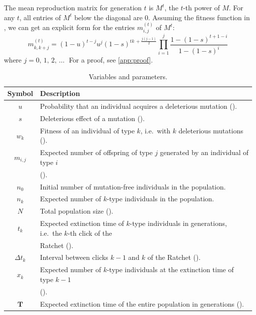 \documentclass[9pt,lineno]{elife}
\begin{document}
The mean reproduction matrix for generation $t$ is $M^{t}$, the $t$-th power of $M$. For any $t$, all entries of $M^{t}$ below the diagonal are 0. 
Assuming the fitness function in , we can get an explicit form for the entries $m_{i,j}^{(t)}$ of $M^{t}$:
%
\begin{equation}
  m^{(t)}_{k,k+j} = \displaystyle (1-u)^{t-j} u^{j}(1 - s)^{tk\,+\textstyle\frac{j(j-1)}{2}}\prod_{i=1}^{j}\frac{1 - (1 - s)^{t+1-i}}{1 - (1 - s)^{i}}
  \label{eq:mt}
\end{equation}
where $j=0,\,1,\,2,\,\ldots\;$
% 
For a proof, see \autoref{app:proof}.  




\begin{table}[!ht]
\caption{\label{tab:pars}Variables and parameters.}
\begin{tabular}{S l}
\toprule
Symbol         & Description     \\
\midrule
$u$            & Probability that an individual acquires a deleterious mutation ().\\
$s$            & Deleterious effect of a mutation ().\\
$w_k$          & Fitness of an individual of type $k$, i.e.\ with $k$ deleterious mutations ().\\
$m_{i, j}$     & Expected number of offspring of type $j$ generated by an individual of type $i$ \\
               & ().\\
$n_{0}$        & Initial number of mutation-free individuals in the population.\\
$n_k$          & Expected number of $k$-type individuals in the population.\\
$N$            & Total population size ().\\
$t_k$          & Expected extinction time of $k$-type individuals in generations, i.e.\ the $k$-th click of the \\
               & Ratchet ().\\
$\Delta t_k$   & Interval between clicks $k-1$ and $k$ of the Ratchet ().\\
$x_k$          & Expected number of $k$-type individuals at the extinction time of type $k-1$ \\
               & ().\\
$\mathbf{T}$   & Expected extinction time of the entire population in generations ().\\
\bottomrule
\end{tabular}



\end{table}
\end{document}
